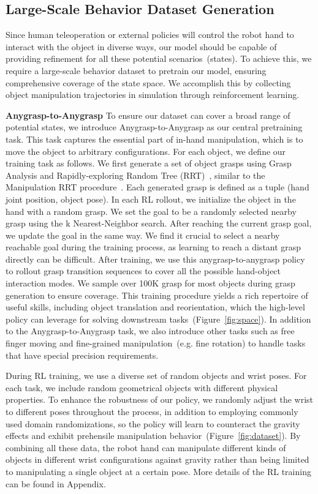 \subsection{Large-Scale Behavior Dataset Generation}
\label{ref:data}
Since human teleoperation or external policies will control the robot hand to interact with the object in diverse ways, our model should be capable of providing refinement for all these potential scenarios~(states). To achieve this, we require a large-scale behavior dataset to pretrain our \mname{} model, ensuring comprehensive coverage of the state space. We accomplish this by collecting object manipulation trajectories in simulation through reinforcement learning. 

\textbf{Anygrasp-to-Anygrasp} To ensure our dataset can cover a broad range of potential states, we introduce Anygrasp-to-Anygrasp as our central pretraining task. This task captures the essential part of in-hand manipulation, which is to move the object to arbitrary configurations. For each object, we define our training task as follows. We first generate a set of object grasps using Grasp Analysis and Rapidly-exploring Random Tree (RRT)~\cite{lavalle2001rapidly}, similar to the Manipulation RRT procedure~\cite{khandate2023sampling}. Each generated grasp is defined as a tuple (hand joint position, object pose). In each RL rollout, we initialize the object in the hand with a random grasp. We set the goal to be a randomly selected nearby grasp using the k Nearest-Neighbor search. After reaching the current grasp goal, we update the goal in the same way. We find it crucial to select a nearby reachable goal during the training process, as learning to reach a distant grasp directly can be difficult. After training, we use this anygrasp-to-anygrasp policy to rollout grasp transition sequences to cover all the possible hand-object interaction modes. We sample over 100K grasp for most objects during grasp generation to ensure coverage. This training procedure yields a rich repertoire of useful skills, including object translation and reorientation, which the high-level policy can leverage for solving downstream tasks~(Figure~\ref{fig:space}). In addition to the Anygrasp-to-Anygrasp task, we also introduce other tasks such as free finger moving and fine-grained manipulation~(e.g. fine rotation) to handle tasks that have special precision requirements. 

During RL training, we use a diverse set of random objects and wrist poses. For each task, we include random geometrical objects with different physical properties. To enhance the robustness of our policy, we randomly adjust the wrist to different poses throughout the process, in addition to employing commonly used domain randomizations, so the policy will learn to counteract the gravity effects and exhibit prehensile manipulation behavior~(Figure~\ref{fig:dataset}). By combining all these data, the robot hand can manipulate different kinds of objects in different wrist configurations against gravity rather than being limited to manipulating a single object at a certain pose. More details of the RL training can be found in Appendix.

